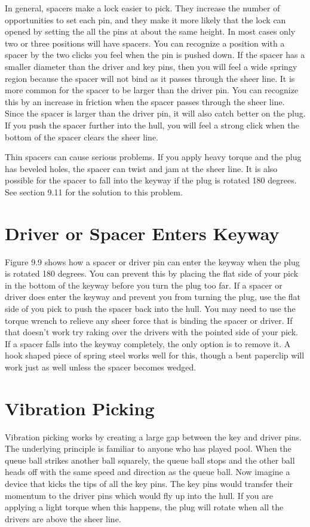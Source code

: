 In general, spacers make a lock easier to pick. They increase the number of opportunities
to set each pin, and they make it more likely that the lock can opened by setting the all the
pins at about the same height. In most cases only two or three positions will have spacers.
You can recognize a position with a spacer by the two clicks you feel when the pin is pushed
down. If the spacer has a smaller diameter than the driver and key pins, then you will feel a
wide springy region because the spacer will not bind as it passes through the sheer line. It is
more common for the spacer to be larger than the driver pin. You can recognize this by an
increase in friction when the spacer passes through the sheer line. Since the spacer is larger
than the driver pin, it will also catch better on the plug. If you push the spacer further into
the hull, you will feel a strong click when the bottom of the spacer clears the sheer line.

Thin spacers can cause serious problems. If you apply heavy torque and the plug has
beveled holes, the spacer can twist and jam at the sheer line. It is also possible for the spacer
to fall into the keyway if the plug is rotated 180 degrees. See section 9.11 for the solution to
this problem.

\section{Driver or Spacer Enters Keyway}

Figure 9.9 shows how a spacer or driver pin can enter the keyway when the plug is rotated
180 degrees. You can prevent this by placing the flat side of your pick in the bottom of the
keyway before you turn the plug too far. If a spacer or driver does enter the keyway and
prevent you from turning the plug, use the flat side of you pick to push the spacer back into
the hull. You may need to use the torque wrench to relieve any sheer force that is binding
the spacer or driver. If that doesn't work try raking over the drivers with the pointed side
of your pick. If a spacer falls into the keyway completely, the only option is to remove it. A
hook shaped piece of spring steel works well for this, though a bent paperclip will work just
as well unless the spacer becomes wedged.

\section{Vibration Picking}
Vibration picking works by creating a large gap between the key and driver pins. The
underlying principle is familiar to anyone who has played pool. When the queue ball strikes
another ball squarely, the queue ball stops and the other ball heads off with the same speed
and direction as the queue ball. Now imagine a device that kicks the tips of all the key pins.
The key pins would transfer their momentum to the driver pins which would fly up into the
hull. If you are applying a light torque when this happens, the plug will rotate when all the
drivers are above the sheer line.


